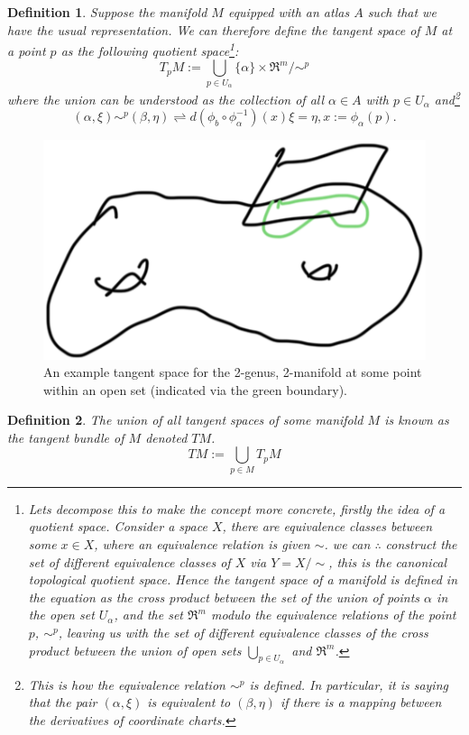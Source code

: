 \documentclass{article}
\newtheorem{definition}{Definition}
\begin{document}
\begin{definition}
        Suppose the manifold $M$ equipped with an atlas $A$ such that we have the usual representation. We can therefore define the tangent space of $M$ at a point $p$ as the following quotient space\footnote{Lets decompose this to make the concept more concrete, firstly the idea of a quotient space. Consider a space $X$, there are equivalence classes between some $x \in X$, where an equivalence relation is given $\sim$. we can $\therefore$ construct the \emph{set} of different equivalence classes of $X$ via $Y = X/\sim$, this is the canonical topological quotient space. Hence the tangent space of a manifold is defined in the equation as the cross product between the set of the union of points $\alpha$ in the open set $U_{\alpha}$, and the set $\Re^{m}$ modulo the equivalence relations of the point $p$, $\sim^{p}$, leaving us with the set of different equivalence classes of the cross product between the union of open sets $\bigcup_{p\in U_{\alpha}}$ and $\Re^{m}$.}: $$T_{p}M := \bigcup_{p\in U_{\alpha}}\{\alpha \} \times  \Re^{m}/\sim^{p}$$
        where the union can be understood as the collection of all $\alpha \in A$ with $p \in U_{\alpha}$ and\footnote{This is how the equivalence relation $\sim^{p}$ is defined. In particular, it is saying that the pair $(\alpha, \xi)$ is equivalent to $(\beta, \eta)$ if there is a  mapping between the derivatives of coordinate charts.}
        $$(\alpha, \xi) \sim^{p} (\beta, \eta) \rightleftharpoons d(\phi_{b} \circ \phi_{\alpha}^{-1})(x)\xi = \eta, x:= \phi_{\alpha}(p).$$
\end{definition}

\begin{figure}[hbt!]
    \centering
    \includegraphics[width=0.3\linewidth]{figures/tangent_space.PNG}
    \caption{An example tangent space for the 2-genus, 2-manifold at some point within an open set (indicated via the green boundary).}
    \label{fig:enter-label}
\end{figure}

\begin{definition}
    The union of all tangent spaces of some manifold $M$ is known as the tangent bundle of $M$ denoted $TM$.
    $$TM := \bigcup_{p\in M}T_{p}M$$
\end{definition}
\end{document}
